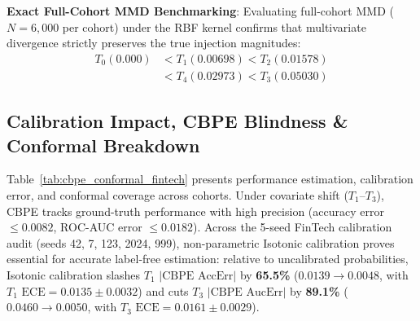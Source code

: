 \documentclass[conference]{IEEEtran}
\begin{document}
\textbf{Exact Full-Cohort MMD Benchmarking}: Evaluating full-cohort MMD ($N=6,000$ per cohort) under the RBF kernel confirms that multivariate divergence strictly preserves the true injection magnitudes:
\begin{equation}
\begin{aligned}
T_0 (0.000) & < T_1 (0.00698) < T_2 (0.01578) \\
& < T_4 (0.02973) < T_3 (0.05030)
\end{aligned} \nonumber
\end{equation}

\subsection{Calibration Impact, CBPE Blindness \& Conformal Breakdown}
Table~\ref{tab:cbpe_conformal_fintech} presents performance estimation, calibration error, and conformal coverage across cohorts. Under covariate shift ($T_1$--$T_3$), CBPE tracks ground-truth performance with high precision (accuracy error $\le 0.0082$, ROC-AUC error $\le 0.0182$). Across the 5-seed FinTech calibration audit (seeds 42, 7, 123, 2024, 999), non-parametric Isotonic calibration proves essential for accurate label-free estimation: relative to uncalibrated probabilities, Isotonic calibration slashes $T_1$ $|\text{CBPE AccErr}|$ by \textbf{65.5\%} ($0.0139 \to 0.0048$, with $T_1$ $\text{ECE}=0.0135 \pm 0.0032$) and cuts $T_3$ $|\text{CBPE AucErr}|$ by \textbf{89.1\%} ($0.0460 \to 0.0050$, with $T_3$ $\text{ECE}=0.0161 \pm 0.0029$). 
\end{document}
